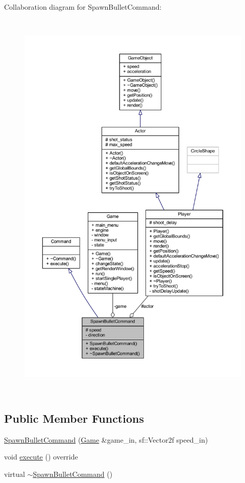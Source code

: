Collaboration diagram for Spawn\+Bullet\+Command\+:\nopagebreak
\begin{figure}[H]
\begin{center}
\leavevmode
\includegraphics[height=550pt]{class_spawn_bullet_command__coll__graph}
\end{center}
\end{figure}
\subsection*{Public Member Functions}
\begin{DoxyCompactItemize}
\item 
\hyperlink{class_spawn_bullet_command_a279b39ecc9491fe12812ac633ecbb992}{Spawn\+Bullet\+Command} (\hyperlink{class_game}{Game} \&game\+\_\+in, sf\+::\+Vector2f speed\+\_\+in)
\item 
void \hyperlink{class_spawn_bullet_command_a558af584b91637cd6bcf989d799eca4d}{execute} () override
\item 
virtual \hyperlink{class_spawn_bullet_command_ac22b1ce86d8ae1d7fb1df78745cb4db6}{$\sim$\+Spawn\+Bullet\+Command} ()
\end{DoxyCompactItemize}
